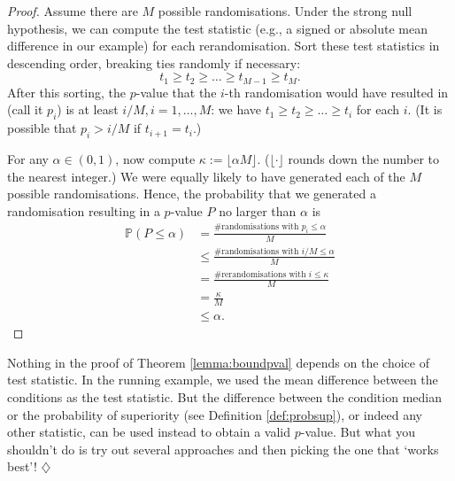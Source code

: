 \documentclass[a4paper]{tufte-book}\usepackage[]{graphicx}\usepackage[]{xcolor}
\newcommand*{\parend}[1][$\diamondsuit$]{%
  \unskip\nobreak\hspace{1em plus 1fill}$\diamondsuit$%
}
\begin{document}
\begin{proof}
  Assume there are $M$ possible randomisations.
  Under the strong null hypothesis, we can compute the test statistic 
  (e.g., a signed or absolute mean difference in our example)
  for each rerandomisation.
  Sort these test statistics in descending order,
  breaking ties randomly if necessary:
  \[
    t_{1} \geq t_{2} \geq \dots \geq t_{M-1} \geq t_{M}.
  \]
  After this sorting, the $p$-value that the $i$-th randomisation would
  have resulted in (call it $p_i$) is at least $i/M, i = 1, \dots, M$:
  we have $t_1 \geq t_2 \geq \dots \geq t_i$ for each $i$.
  (It is possible that $p_i > i/M$ if $t_{i+1} = t_{i}$.)
  
  For any $\alpha \in (0, 1)$, now compute $\kappa := \lfloor \alpha M \rfloor$.
  ($\lfloor \cdot \rfloor$ rounds down the number to the nearest integer.)
  We were equally likely to have generated
  each of the $M$ possible randomisations.
  Hence, the probability that we generated a randomisation resulting
  in a $p$-value $P$ no larger than $\alpha$ is
  \begin{align*}
    \mathbb{P}(P \leq \alpha)
    &= \frac{\textrm{\# randomisations with $p_i \leq \alpha$}}{M}\\
    &\leq \frac{\textrm{\# randomisations with $i/M \leq \alpha$}}{M}\\
    &= \frac{\textrm{\# rerandomisations with $i \leq \kappa$}}{M} \\
    &= \frac{\kappa}{M} \\
    &\leq \alpha.
  \end{align*}
\end{proof}

  Nothing in the proof of Theorem \ref{lemma:boundpval} depends on the choice
  of test statistic. In the running example, we used the mean difference between
  the conditions as the test statistic. 
  But the difference between the condition median or the probability of superiority
  (see Definition \vref{def:probsup}), or indeed any other statistic,
  can be used instead to obtain a valid $p$-value.
  But what you shouldn't do is try out several approaches and then picking
  the one that `works best'!
\parend
\end{document}
